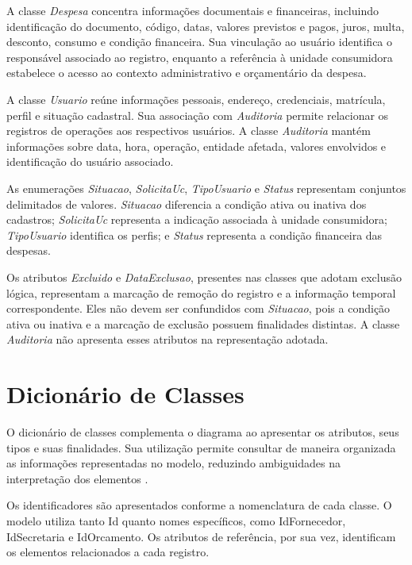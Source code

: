 A classe \textit{Despesa} concentra informações documentais e financeiras, incluindo identificação do documento, código, datas, valores previstos e pagos, juros, multa, desconto, consumo e condição financeira. Sua vinculação ao usuário identifica o responsável associado ao registro, enquanto a referência à unidade consumidora estabelece o acesso ao contexto administrativo e orçamentário da despesa.

A classe \textit{Usuario} reúne informações pessoais, endereço, credenciais, matrícula, perfil e situação cadastral. Sua associação com \textit{Auditoria} permite relacionar os registros de operações aos respectivos usuários. A classe \textit{Auditoria} mantém informações sobre data, hora, operação, entidade afetada, valores envolvidos e identificação do usuário associado.

As enumerações \textit{Situacao}, \textit{SolicitaUc}, \textit{TipoUsuario} e \textit{Status} representam conjuntos delimitados de valores. \textit{Situacao} diferencia a condição ativa ou inativa dos cadastros; \textit{SolicitaUc} representa a indicação associada à unidade consumidora; \textit{TipoUsuario} identifica os perfis; e \textit{Status} representa a condição financeira das despesas.

Os atributos \textit{Excluido} e \textit{DataExclusao}, presentes nas classes que adotam exclusão lógica, representam a marcação de remoção do registro e a informação temporal correspondente. Eles não devem ser confundidos com \textit{Situacao}, pois a condição ativa ou inativa e a marcação de exclusão possuem finalidades distintas. A classe \textit{Auditoria} não apresenta esses atributos na representação adotada.

\section{Dicionário de Classes}
\label{sec:dicionario-classes}

O dicionário de classes complementa o diagrama ao apresentar os atributos, seus tipos e suas finalidades. Sua utilização permite consultar de maneira organizada as informações representadas no modelo, reduzindo ambiguidades na interpretação dos elementos \parencite{omg2017uml,larman2005}.

Os identificadores são apresentados conforme a nomenclatura de cada classe. O modelo utiliza tanto Id quanto nomes específicos, como IdFornecedor, IdSecretaria e IdOrcamento. Os atributos de referência, por sua vez, identificam os elementos relacionados a cada registro.

